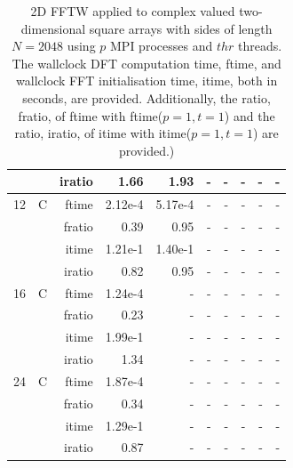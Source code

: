 \documentclass[a4paper]{article}
\begin{document}
\begin{table}[htbp]
\begin{center}
\begin{small}
\begin{tabular}{|r|r|r|r|r|r|r|r|r|r|}
             &             &  iratio &    1.66  &    1.93  &      - &      - &      - &      - &      - \\\hline
   12 &   C &  ftime &    2.12e-4 &    5.17e-4 &      - &      - &      - &      - &      - \\
             &             &  fratio &    0.39 &    0.95 &      - &      - &      - &      - &      - \\
             &             &  itime &    1.21e-1 &    1.40e-1 &      - &      - &      - &      - &      - \\
             &             &  iratio &   0.82 &    0.95 &      - &      - &      - &      - &      - \\\hline
   16 &   C &  ftime &    1.24e-4 &      - &      - &      - &      - &      - &      - \\
             &             &  fratio &    0.23 &      - &      - &      - &      - &      - &      - \\
             &             &  itime &    1.99e-1 &      - &      - &      - &      - &      - &      - \\
             &             &  iratio &    1.34  &      - &      - &      - &      - &      - &      - \\\hline
   24 &   C &  ftime &    1.87e-4 &      - &      - &      - &      - &      - &      - \\
             &             &  fratio &    0.34 &      - &      - &      - &      - &      - &      - \\
             &             &  itime &    1.29e-1 &      - &      - &      - &      - &      - &      - \\
             &             &  iratio &    0.87 &      - &      - &      - &      - &      - &      - \\\hline
\end{tabular}
\caption{2D FFTW applied to complex valued two-dimensional square arrays with sides of length $N=2048$ using $p$ MPI processes and $thr$ threads. The wallclock DFT computation time, ftime, and wallclock FFT initialisation time, itime, both in seconds, are provided. Additionally, the ratio, fratio, of ftime  with ftime($p=1,t=1$) and the ratio, iratio, of itime  with itime($p=1,t=1$) are provided.) }\label{Tbl:FFTW2d2048c}
\end{small}
\end{center}
\end{table}
\end{document}
